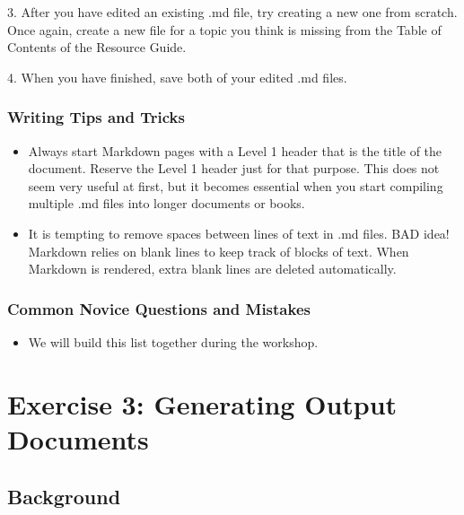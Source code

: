 \documentclass[
]{article}
\providecommand{\tightlist}{%
  \setlength{\itemsep}{0pt}\setlength{\parskip}{0pt}}
\begin{document}
3. After you have edited an existing .md file, try creating a new one
from scratch. Once again, create a new file for a topic you think is
missing from the Table of Contents of the Resource Guide.

4. When you have finished, save both of your edited .md files.

\hypertarget{writing-tips-and-tricks}{%
\subsubsection{Writing Tips and Tricks}\label{writing-tips-and-tricks}}

\begin{itemize}
\tightlist
\item
  Always start Markdown pages with a Level 1 header that is the title of
  the document. Reserve the Level 1 header just for that purpose. This
  does not seem very useful at first, but it becomes essential when you
  start compiling multiple .md files into longer documents or books.
\item
  It is tempting to remove spaces between lines of text in .md files.
  BAD idea! Markdown relies on blank lines to keep track of blocks of
  text. When Markdown is rendered, extra blank lines are deleted
  automatically.
\end{itemize}

\hypertarget{common-novice-questions-and-mistakes}{%
\subsubsection{Common Novice Questions and
Mistakes}\label{common-novice-questions-and-mistakes}}

\begin{itemize}
\tightlist
\item
  We will build this list together during the workshop.
\end{itemize}

\hypertarget{exercise-3-generating-output-documents}{%
\section{Exercise 3: Generating Output
Documents}\label{exercise-3-generating-output-documents}}

\hypertarget{background-2}{%
\subsection{Background}\label{background-2}}
\end{document}

